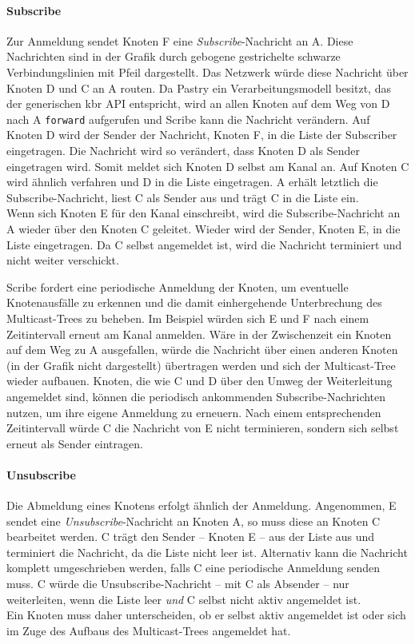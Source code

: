 \paragraph{Subscribe}
Zur Anmeldung sendet Knoten F eine \emph{Subscribe}-Nachricht an A. Diese Nachrichten sind in der Grafik durch gebogene gestrichelte schwarze Verbindungslinien mit Pfeil dargestellt. Das Netzwerk würde diese Nachricht über Knoten D und C an A routen. Da Pastry ein Verarbeitungsmodell besitzt, das der generischen \ac{kbr} API entspricht, wird an allen Knoten auf dem Weg von D nach A \texttt{forward} aufgerufen und Scribe kann die Nachricht verändern. Auf Knoten D wird der Sender der Nachricht, Knoten F, in die Liste der Subscriber eingetragen. Die Nachricht wird so verändert, dass Knoten D als Sender eingetragen wird. Somit meldet sich Knoten D selbst am Kanal an. Auf Knoten C wird ähnlich verfahren und D in die Liste eingetragen. A erhält letztlich die Subscribe-Nachricht, liest C als Sender aus und trägt C in die Liste ein.\\
Wenn sich Knoten E für den Kanal einschreibt, wird die Subscribe-Nachricht an A wieder über den Knoten C geleitet. Wieder wird der Sender, Knoten E, in die Liste eingetragen. Da C selbst angemeldet ist, wird die Nachricht terminiert und nicht weiter verschickt.

Scribe fordert eine periodische Anmeldung der Knoten, um eventuelle Knotenausfälle zu erkennen und die damit einhergehende Unterbrechung des Multicast-Trees zu beheben. Im Beispiel würden sich E und F nach einem Zeitintervall erneut am Kanal anmelden. Wäre in der Zwischenzeit ein Knoten auf dem Weg zu A ausgefallen, würde die Nachricht über einen anderen Knoten (in der Grafik nicht dargestellt) übertragen werden und sich der Multicast-Tree wieder aufbauen. Knoten, die wie C und D über den Umweg der Weiterleitung angemeldet sind, können die periodisch ankommenden Subscribe-Nachrichten nutzen, um ihre eigene Anmeldung zu erneuern. Nach einem entsprechenden Zeitintervall würde C die Nachricht von E nicht terminieren, sondern sich selbst erneut als Sender eintragen.

\paragraph{Unsubscribe}
Die Abmeldung eines Knotens erfolgt ähnlich der Anmeldung. Angenommen, E sendet eine \emph{Unsubscribe}-Nachricht an Knoten A, so muss diese an Knoten C bearbeitet werden. C trägt den Sender -- Knoten E -- aus der Liste aus und terminiert die Nachricht, da die Liste nicht leer ist. Alternativ kann die Nachricht komplett umgeschrieben werden, falls C eine periodische Anmeldung senden muss. C würde die Unsubscribe-Nachricht -- mit C als Absender -- nur weiterleiten, wenn die Liste leer \emph{und} C selbst nicht aktiv angemeldet ist.\\
Ein Knoten muss daher unterscheiden, ob er selbst aktiv angemeldet ist oder sich im Zuge des Aufbaus des Multicast-Trees angemeldet hat.


